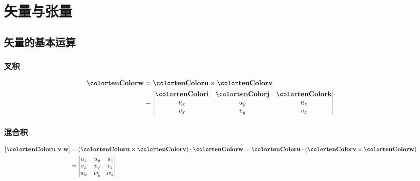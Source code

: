 \chapter{矢量与张量}

\section{矢量的基本运算}

\subsection{叉积}

\begin{align}
\ten{w} &= \ten{u} \times \ten{v}\cr
~ &= \begin{vmatrix}
\ten{i} & \ten{j} & \ten{k}\cr
u_x & u_y & u_z\cr
v_x & v_y & v_z\end{vmatrix}
\end{align}

\subsection{混合积}

\begin{align}
\left[\ten{u\ v\ w}\right] &= (\ten{u}\times\ten{v})\cdot\ten{w} = \ten{u}\cdot(\ten{v}\times\ten{w})\cr
~&= \begin{vmatrix}
u_x & u_y & u_z\cr
v_x & v_y & v_z\cr
w_x & w_y & w_z\end{vmatrix}
\end{align}
